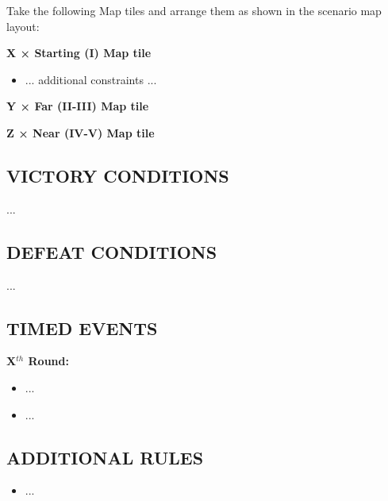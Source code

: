 \begin{multicols*}{2}
Take the following Map tiles and arrange them as shown in the scenario map layout:

  \textbf{X × Starting (I) Map tile}
\begin{itemize}
    \item ... additional constraints ...
\end{itemize}

\textbf{Y × Far (II-III) Map tile}

\textbf{Z × Near (IV-V) Map tile}

\subsection*{\MakeUppercase{Victory Conditions}}
...

\subsection*{\MakeUppercase{Defeat Conditions}}
...

\subsection*{\MakeUppercase{Timed Events}}

\textbf{X$^{th}$ Round:}
\begin{itemize}
  \item ...
  \item ...
\end{itemize}

%
%
% 

\subsection*{\MakeUppercase{Additional Rules}}

\begin{itemize}
    \item ...
\end{itemize}

\end{multicols*}

